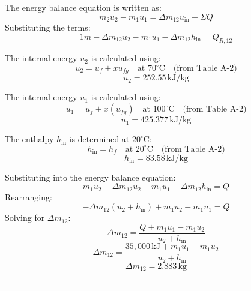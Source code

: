 The energy balance equation is written as:  
\[
m_2 u_2 - m_1 u_1 = \Delta m_{12} u_{\text{in}} + \Sigma Q
\]  
Substituting the terms:  
\[
1 m - \Delta m_{12} u_2 - m_1 u_1 - \Delta m_{12} h_{\text{in}} = Q_{R,12}
\]  

The internal energy \( u_2 \) is calculated using:  
\[
u_2 = u_f + x u_{fg} \quad \text{at } 70^\circ\text{C} \quad \text{(from Table A-2)}
\]  
\[
u_2 = 252.55 \, \text{kJ/kg}
\]  

The internal energy \( u_1 \) is calculated using:  
\[
u_1 = u_f + x (u_{fg}) \quad \text{at } 100^\circ\text{C} \quad \text{(from Table A-2)}
\]  
\[
u_1 = 425.377 \, \text{kJ/kg}
\]  

The enthalpy \( h_{\text{in}} \) is determined at \( 20^\circ\text{C} \):  
\[
h_{\text{in}} = h_f \quad \text{at } 20^\circ\text{C} \quad \text{(from Table A-2)}
\]  
\[
h_{\text{in}} = 83.58 \, \text{kJ/kg}
\]  

Substituting into the energy balance equation:  
\[
m_1 u_2 - \Delta m_{12} u_2 - m_1 u_1 - \Delta m_{12} h_{\text{in}} = Q
\]  
Rearranging:  
\[
-\Delta m_{12} (u_2 + h_{\text{in}}) + m_1 u_2 - m_1 u_1 = Q
\]  
Solving for \( \Delta m_{12} \):  
\[
\Delta m_{12} = \frac{Q + m_1 u_1 - m_1 u_2}{u_2 + h_{\text{in}}}
\]  
\[
\Delta m_{12} = \frac{35,000 \, \text{kJ} + m_1 u_1 - m_1 u_2}{u_2 + h_{\text{in}}}
\]  
\[
\Delta m_{12} = 2.883 \, \text{kg}
\]  

---